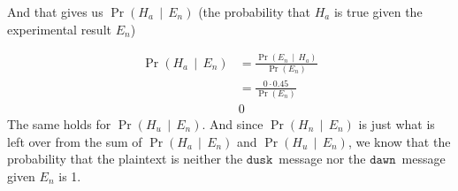 \documentclass{article}
\newcommand{\prob}[1]{\ensuremath{\operatorname{Pr}\left( #1 \right)}}
\newcommand{\condprob}[2]{\prob{#1\, \middle|\, #2}}
\newcommand\mdusk{\ensuremath{\mathtt{dusk}}}
\newcommand\mdawn{\ensuremath{\mathtt{dawn}}}
\begin{document}
And that gives us \condprob{H_a}{E_n} (the probability that $H_a$ is true given the experimental result $E_n$)

\begin{align*}
    \condprob{H_a}{E_n} &= \frac{\condprob{E_n}{H_a}}{\prob{E_n}} \\
                        &= \frac{0 \cdot 0.45}{\prob{E_n}} \\
                        & 0 
\end{align*}
The same holds for $\condprob{H_u}{E_n}$. And since $\condprob{H_n}{E_n}$ is just what is left over from the sum of  $\condprob{H_a}{E_n}$ and $\condprob{H_u}{E_n}$, we know that the probability that the plaintext is neither the \mdusk\ message nor the \mdawn\ message given $E_n$ is 1.
\end{document}
